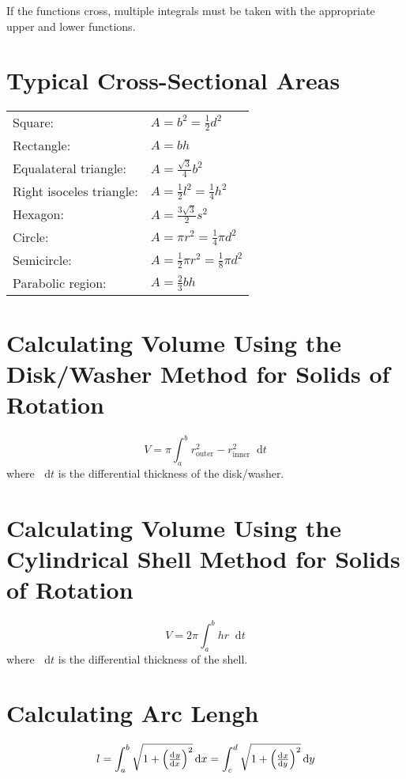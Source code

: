 \documentclass[12pt]{article}
\DeclarePairedDelimiter\paren{(}{)}
\newcommand*{\dd}[3][]{\tfrac{\mathrm{d}^{#1}#2}{\mathrm{d}#3^{#1}}}
\newcommand*{\D}[1]{\mathop{}\!\mathrm{d}#1}
\newcommand*{\fixmath}{%
  \makebox{}\vspace{\glueexpr-\baselineskip-\abovedisplayskip}}
\newenvironment{fixaskip}{\setlength{\abovedisplayskip}{0pt}\fixmath%
  \ignorespaces}{\ignorespacesafterend}
\newenvironment{fixbskip}{\setlength{\belowdisplayskip}{0pt}\ignorespaces}%
  {\ignorespacesafterend}
\begin{document}
If the functions cross, multiple integrals must be taken with the appropriate
upper and lower functions.
\section*{Typical Cross-Sectional Areas}
{\renewcommand{\arraystretch}{1.5}\begin{tabular}{l@{ }l}
  Square: & \(A = b^2 = \frac{1}{2}d^2\)\\
  Rectangle: & \(A = bh\)\\
  Equalateral triangle: & \(A = \frac{\sqrt{3}}{4}b^2\)\\
  Right isoceles triangle: & \(A = \frac{1}{2}l^2 = \frac{1}{4}h^2\)\\
  Hexagon: & \(A = \frac{3\sqrt{3}}{2} s^2\)\\
  Circle: & \(A = \pi r^2 = \frac{1}{4}\pi d^2\)\\
  Semicircle: & \(A = \frac{1}{2}\pi r^2 = \frac{1}{8}\pi d^2\)\\
  Parabolic region: & \(A = \frac{2}{3}bh\)
\end{tabular}}
\section*{Calculating Volume Using the Disk\slash Washer Method for Solids of
Rotation}
\begin{fixaskip}
  \[
    V = \pi\int_a^b r_{\text{outer}}^2 - r_{\text{inner}}^2 \D{t}
  \]
\end{fixaskip}
where \(\D{t}\) is the differential thickness of the disk\slash washer.
\section*{Calculating Volume Using the Cylindrical Shell Method for Solids of
Rotation}
\begin{fixaskip}
  \[
    V = 2\pi \int_a^b hr \D{t}
  \]
\end{fixaskip}
where \(\D{t}\) is the differential thickness of the shell.
\section*{Calculating Arc Lengh}
\begin{fixbskip}
  \[
    l = \int_a^b \sqrt{1+{\paren*{\dd{y}{x}}}^2} \D{x}
    = \int_c^d \sqrt{1+{\paren*{\dd{x}{y}}}^2} \D{y}
  \]
\end{fixbskip}
\end{document}
